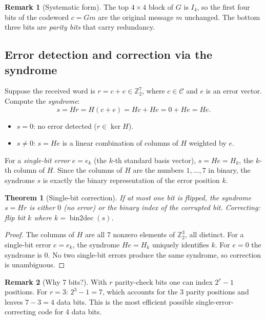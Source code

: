 \documentclass[11pt]{article}
\theoremstyle{definition}
\newtheorem{remark}{Remark}[section]
\theoremstyle{plain}
\newtheorem{theorem}{Theorem}[section]
\begin{document}
\begin{remark}[Systematic form]
  The top $4\times 4$ block of $G$ is $I_4$, so the first four bits of
  the codeword $c = Gm$ are the original message $m$ unchanged.  The
  bottom three bits are \emph{parity bits} that carry redundancy.
\end{remark}

\subsection{Error detection and correction via the syndrome}

Suppose the received word is $r = c + e\in\mathbb{Z}_2^7$, where
$c\in\mathcal{C}$ and $e$ is an error vector.  Compute the
\emph{syndrome}:
\[
  s = Hr = H(c+e) = Hc + He = 0 + He = He.
\]
\begin{itemize}
  \item $s = 0$: no error detected ($r\in\ker H$).
  \item $s \ne 0$: $s = He$ is a linear combination of columns of $H$
        weighted by $e$.
\end{itemize}

For a \emph{single-bit error} $e = e_k$ (the $k$-th standard basis
vector), $s = He = H_k$, the $k$-th column of $H$.  Since the columns
of $H$ are the numbers $1,\ldots,7$ in binary, the syndrome $s$
is exactly the binary representation of the error position $k$.

\begin{theorem}[Single-bit correction]
  If at most one bit is flipped, the syndrome $s = Hr$ is either $0$
  (no error) or the binary index of the corrupted bit.  Correcting:
  flip bit $k$ where $k = \operatorname{bin2dec}(s)$.
\end{theorem}
\begin{proof}
  The columns of $H$ are all 7 nonzero elements of $\mathbb{Z}_2^3$,
  all distinct.  For a single-bit error $e = e_k$, the syndrome
  $He = H_k$ uniquely identifies $k$.  For $e = 0$ the syndrome is $0$.
  No two single-bit errors produce the same syndrome, so correction is
  unambiguous.
\end{proof}

\begin{remark}[Why 7 bits?]
  With $r$ parity-check bits one can index $2^r - 1$ positions.  For
  $r=3$: $2^3-1=7$, which accounts for the 3 parity positions and
  leaves $7-3=4$ data bits.  This is the most efficient possible
  single-error-correcting code for 4 data bits.
\end{remark}
\end{document}

